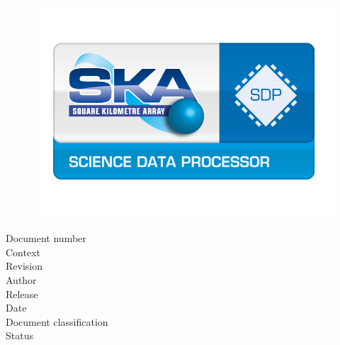 \thispagestyle{empty}


\setlength{\unitlength}{1mm}


\phantom{test}
\begin{figure}[h]
  \centering
  \includegraphics[width=\textwidth]{figs/logos/science_data_processor_logo.jpg}
\end{figure}

\vspace{-1cm}

\begin{center}
\fontsize{22}{24}\selectfont \sffamily\bigdoctitle
\end{center}

\vspace{1cm}

\noindent\normalsize{Document number \dotfill \docnr}\\
\normalsize{Context \dotfill \context}\\
\normalsize{Revision \dotfill \revision}\\
\normalsize{Author \dotfill \docauthor}\\
\normalsize{Release \dotfill \release}\\
\normalsize{Date \dotfill \docudate}\\
\normalsize{Document classification \dotfill \classification}\\
\normalsize{Status \dotfill \docstatus}

\vspace{1.5cm}

\begin{center}
\signaturetable
\end{center}


\newpage


\begin{center}
\versiontable
\end{center}

\vspace{1cm}

\begin{center}
\organisationtable
\end{center}


